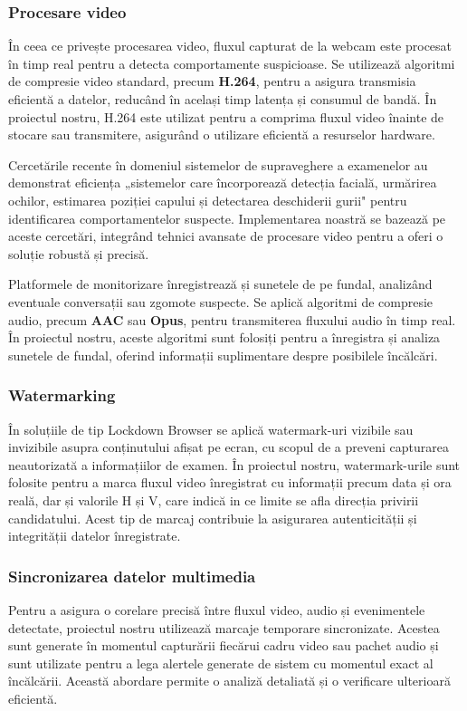 \documentclass[12pt,a4paper]{article}
\begin{document}
\subsubsection{Procesare video}
În ceea ce privește procesarea video, fluxul capturat de la webcam este procesat în
timp real pentru a detecta comportamente suspicioase. Se utilizează algoritmi de
compresie video standard, precum \textbf{H.264}, pentru a asigura transmisia
eficientă a datelor, reducând în același timp latența și consumul de
bandă\cite{goodfellow2016deep}. În proiectul nostru, H.264 este utilizat pentru a comprima fluxul video înainte de stocare sau transmitere, asigurând o utilizare eficientă a resurselor hardware.

Cercetările recente în domeniul sistemelor de supraveghere a examenelor au demonstrat eficiența 
„sistemelor care încorporează detecția facială, urmărirea ochilor, estimarea poziției capului și 
detectarea deschiderii gurii"\cite{alem2021novel} pentru identificarea comportamentelor suspecte. 
Implementarea noastră se bazează pe aceste cercetări, integrând tehnici avansate de procesare video 
pentru a oferi o soluție robustă și precisă.

Platformele de monitorizare înregistrează și sunetele de pe fundal, analizând 
eventuale conversații sau zgomote suspecte. Se aplică algoritmi de compresie audio, 
precum \textbf{AAC} sau \textbf{Opus}, pentru transmiterea fluxului audio în timp real. În proiectul nostru, aceste algoritmi sunt folosiți pentru a înregistra și analiza sunetele de fundal, oferind informații suplimentare despre posibilele încălcări.

\subsubsection{Watermarking}
În soluțiile de tip Lockdown Browser se aplică watermark-uri vizibile sau invizibile asupra conținutului afișat pe ecran, cu scopul de a preveni capturarea neautorizată a informațiilor de examen. În proiectul nostru, watermark-urile sunt folosite pentru a marca fluxul video înregistrat cu informații precum data și ora reală, dar și valorile H și V, care indică in ce limite se afla direcția privirii candidatului. Acest tip de marcaj contribuie la asigurarea autenticității și integrității datelor înregistrate.

\subsubsection{Sincronizarea datelor multimedia}
Pentru a asigura o corelare precisă între fluxul video, audio și evenimentele detectate, proiectul nostru utilizează marcaje temporare sincronizate. Acestea sunt generate în momentul capturării fiecărui cadru video sau pachet audio și sunt utilizate pentru a lega alertele generate de sistem cu momentul exact al încălcării. Această abordare permite o analiză detaliată și o verificare ulterioară eficientă.
\end{document}

